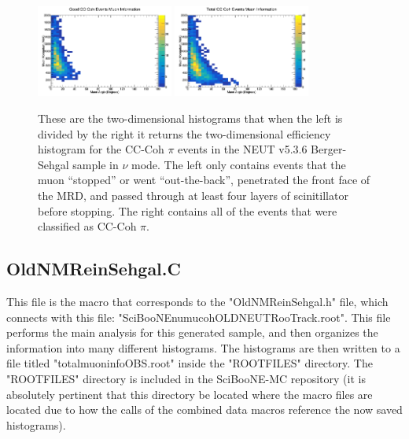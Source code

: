 \documentclass[11pt]{article}
\begin{document}
\begin{figure}[H]
\centering
\includegraphics[width=0.4\textwidth]{NewNMBergerSehgalImages/7.png}
\includegraphics[width=0.4\textwidth]{NewNMBergerSehgalImages/8.png}
\caption{These are the two-dimensional histograms that when the left is divided by the right it returns the two-dimensional efficiency histogram for the CC-Coh $\pi$ events in the NEUT v5.3.6 Berger-Sehgal sample in $\nu$ mode. The left only contains events that the muon ``stopped'' or went ``out-the-back'', penetrated the front face of the MRD, and passed through at least four layers of scinitillator before stopping. The right contains all of the events that were classified as CC-Coh $\pi$.}
\label{fig:app:NMCCCohMuon2DBS}
\end{figure}


\subsection{OldNMReinSehgal.C}
\label{sub:OldNMReinSehgal.C}
This file is the macro that corresponds to the "OldNMReinSehgal.h" file, which connects with this file: "SciBooNE\textunderscore numu\textunderscore coh\textunderscore OLDNEUT\textunderscore RooTrack.root". This file performs the main analysis for this generated sample, and then organizes the information into many different histograms. The histograms are then written to a file titled "totalmuoninfoOBS.root" inside the "ROOTFILES" directory. The "ROOTFILES" directory is included in the SciBooNE-MC repository (it is absolutely pertinent that this directory be located where the macro files are located due to how the calls of the combined data macros reference the now saved histograms).
\end{document}

